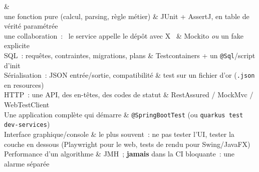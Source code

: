 \begin{tablez}[p{0.24\textwidth}X]
  \headrow {} \&  \\
  \midrule
  une fonction pure (calcul, parsing, r\`egle m\'etier) \& JUnit + AssertJ, en table de v\'erit\'e param\'etr\'ee \\
  une collaboration~: \og ~le service appelle le d\'ep\^ot avec X~ \fg{} \& Mockito \emph{ou} un fake explicite \\
  SQL~: requ\^etes, contraintes, migrations, plans \& Testcontainers + un \verb|@Sql|/script d'init \\
  S\'erialisation~: JSON entr\'ee/sortie, compatibilit\'e \& test sur un fichier d'or (\verb|.json| en resources) \\
  HTTP~: une API, des en-t\^etes, des codes de statut \& RestAssured / MockMvc / WebTestClient \\
  Une application compl\`ete qui d\'emarre \& \verb|@SpringBootTest| (ou \verb|quarkus test dev-services|) \\
  Interface graphique/console \& le plus souvent~: ne pas tester l'UI, tester la couche en dessous (Playwright pour le web, tests de rendu pour Swing/JavaFX) \\
  Performance d'un algorithme \& JMH~; \textbf{jamais} dans la CI bloquante~: une alarme s\'epar\'ee \\
\end{tablez}

